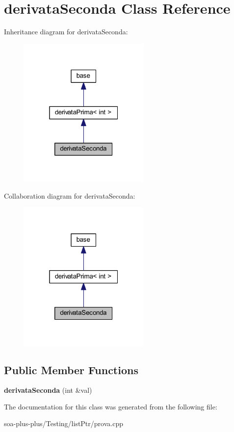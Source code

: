 \hypertarget{classderivata_seconda}{
\section{derivataSeconda Class Reference}
\label{classderivata_seconda}
}


Inheritance diagram for derivataSeconda:\nopagebreak
\begin{figure}[H]
\begin{center}
\leavevmode
\includegraphics[width=184pt]{classderivata_seconda__inherit__graph}
\end{center}
\end{figure}


Collaboration diagram for derivataSeconda:\nopagebreak
\begin{figure}[H]
\begin{center}
\leavevmode
\includegraphics[width=184pt]{classderivata_seconda__coll__graph}
\end{center}
\end{figure}
\subsection*{Public Member Functions}
\begin{DoxyCompactItemize}
\item 
\hypertarget{classderivata_seconda_a9986153b58ea262aadd07bbd11e9f5a6}{
{\bfseries derivataSeconda} (int \&val)}
\label{classderivata_seconda_a9986153b58ea262aadd07bbd11e9f5a6}

\end{DoxyCompactItemize}


The documentation for this class was generated from the following file:\begin{DoxyCompactItemize}
\item 
soa-\/plus-\/plus/Testing/listPtr/prova.cpp\end{DoxyCompactItemize}
